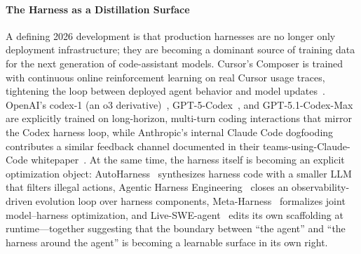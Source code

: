 \paragraph{The Harness as a Distillation Surface}
A defining 2026 development is that production harnesses are no longer only deployment infrastructure; they are becoming a dominant source of training data for the next generation of code-assistant models.
Cursor's Composer is trained with continuous online reinforcement learning on real Cursor usage traces, tightening the loop between deployed agent behavior and model updates~\citep{cursor2025composer,cursor2025rtrl}.
OpenAI's codex-1 (an o3 derivative)~\citep{codex2025}, GPT-5-Codex~\citep{openai2025gpt5codexcard}, and GPT-5.1-Codex-Max~\citep{openai2026codexmax} are explicitly trained on long-horizon, multi-turn coding interactions that mirror the Codex harness loop, while Anthropic's internal Claude Code dogfooding contributes a similar feedback channel documented in their teams-using-Claude-Code whitepaper~\citep{anthropic2025teams}.
At the same time, the harness itself is becoming an explicit optimization object: AutoHarness~\citep{lou2026autoharness} synthesizes harness code with a smaller LLM that filters illegal actions, Agentic Harness Engineering~\citep{lin2026agentic} closes an observability-driven evolution loop over harness components, Meta-Harness~\citep{lee2026metaharness} formalizes joint model--harness optimization, and Live-SWE-agent~\citep{xia2025live} edits its own scaffolding at runtime---together suggesting that the boundary between ``the agent'' and ``the harness around the agent'' is becoming a learnable surface in its own right.


